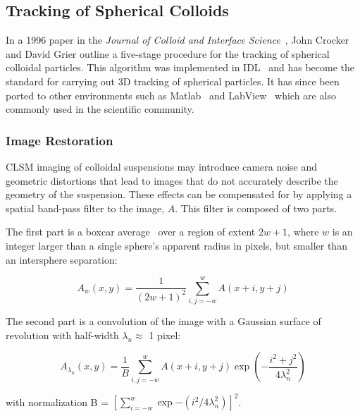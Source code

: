 \subsection{Tracking of Spherical Colloids}

In a 1996 paper in the \textit{Journal of Colloid and Interface Science}~\cite{crocker-grier-spheres},
John Crocker and David Grier outline a five-stage procedure for the tracking of
spherical colloidal particles.  This algorithm was implemented in IDL~\cite{idl-track}
and has become the standard for carrying out 
3D tracking of spherical particles. It has since been ported to other environments such as 
Matlab~\cite{blair-dufrense-matlab, kilfoil-matlab} and LabView~\cite{optical-trapping-group} which are
also commonly used in the scientific community.

\subsubsection{Image Restoration}
\label{sec:band-pass}

CLSM imaging of colloidal suspensions may introduce camera noise and geometric distortions that
lead to images that do not
accurately describe the geometry of the suspension. 
These effects can be compensated for by applying a spatial band-pass filter 
to the image, $A$. This filter is composed of two parts.

The first part is a boxcar average~\cite{soille-book} over a region of extent $2w + 1$, where $w$ is an integer
larger than a single sphere's apparent radius in pixels, but smaller than an intersphere separation:

\begin{center}\begin{equation}A_w(x,y) = \frac{1}{(2w+1)^2} \sum_{i,j=-w}^w A(x+i,y+j)
\end{equation}\end{center}

The second part is a convolution of the image with a Gaussian surface of revolution with 
half-width $\lambda_n \approx $ 1 pixel:

\begin{center}\begin{equation}A_{\lambda_n}(x,y) = \frac{1}{B} \sum_{i,j=-w}^w A(x+i,y+j)\exp{\left(-\frac{i^2+j^2}{4\lambda_n^2}\right)}
\end{equation}\end{center}

with normalization B = $[\sum_{i=-w}^w \exp{-(i^2/4\lambda_n^2)}]^2$.


